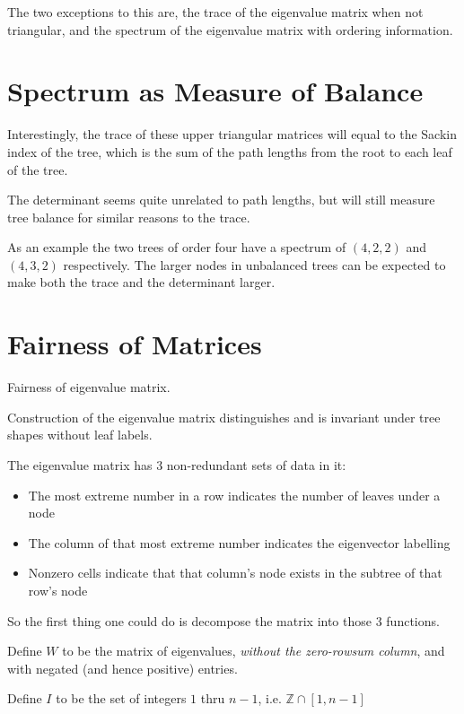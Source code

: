 \documentclass[10pt,a4paper]{report}
\begin{document}
The two exceptions to this are, the trace of the eigenvalue matrix when not
triangular, and the spectrum of the eigenvalue matrix with ordering
information.

\section{Spectrum as Measure of Balance}

Interestingly, the trace of these upper triangular matrices will equal to the Sackin index of the tree, which is the sum of the path lengths from the root to each leaf of the tree.

The determinant seems quite unrelated to path lengths, but will still measure tree balance for similar reasons to the trace.

As an example the two trees of order four have a spectrum of $(4, 2, 2)$ and $(4, 3, 2)$ respectively.
The larger nodes in unbalanced trees can be expected to make both the trace and the determinant larger.

\section{Fairness of Matrices}

\begin{theorem-wip} Fairness of eigenvalue matrix.

	Construction of the eigenvalue matrix distinguishes and is invariant under tree shapes without leaf labels.
\end{theorem-wip}

The eigenvalue matrix has 3 non-redundant sets of data in it:
\begin{itemize}
	\item The most extreme number in a row indicates the number of leaves under
		a node
	\item The column of that most extreme number indicates the eigenvector
		labelling
	\item Nonzero cells indicate that that column's node exists in the subtree
		of that row's node
\end{itemize}

So the first thing one could do is decompose the matrix into those 3 functions.

Define $W$ to be the matrix of eigenvalues, \emph{without the zero-rowsum
column}, and with negated (and hence positive) entries.

Define $I$ to be the set of integers $1$ thru $n-1$, i.e. $\mathds{Z} \cap [1,
n-1]$
\end{document}
